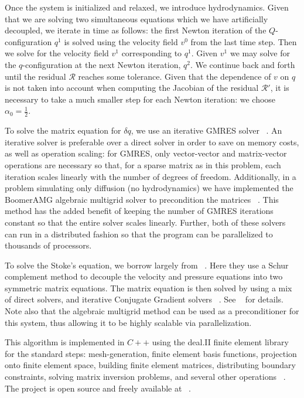 \documentclass[reqno]{article}
\begin{document}
  Once the system is initialized and relaxed, we introduce hydrodynamics.
  Given that we are solving two simultaneous equations which we have
  artificially decoupled, we iterate in time as follows: the first Newton
  iteration of the $Q$-configuration $q^1$ is solved using the velocity field
  $v^0$ from the last time step.
  Then we solve for the velocity field $v^1$ corresponding to $q^1$.
  Given $v^1$ we may solve for the $q$-configuration at the next Newton
  iteration, $q^2$.
  We continue back and forth until the residual $\mathcal{R}$ reaches some
  tolerance.
  Given that the dependence of $v$ on $q$ is not taken into account when
  computing the Jacobian of the residual $\mathcal{R}'$, it is necessary to take
  a much smaller step for each Newton iteration: we choose $\alpha_0 =
  \tfrac12$.

  To solve the matrix equation for $\delta q$, we use an iterative GMRES solver ~\cite{demmel_applied_1997}.
  An iterative solver is preferable over a direct solver in order to save on
  memory costs, as well as operation scaling: for GMRES, only vector-vector and
  matrix-vector operations are necessary so that, for a sparse matrix as in this
  problem, each iteration scales linearly with the number of degrees of freedom.
  Additionally, in a problem simulating only diffusion (no hydrodynamics) we
  have implemented the BoomerAMG algebraic multigrid solver to precondition the
  matrices ~\cite{henson_boomeramg_2002}.
  This method has the added benefit of keeping the number of GMRES iterations
  constant so that the entire solver scales linearly.
  Further, both of these solvers can run in a distributed fashion so that the
  program can be parallelized to thousands of processors.

  To solve the Stoke's equation, we borrow largely from ~\cite{step_22}.
  Here they use a Schur complement method to decouple the velocity and pressure
  equations into two symmetric matrix equations.
  The matrix equation is then solved by using a mix of direct solvers, and
  iterative Conjugate Gradient solvers ~\cite{demmel_applied_1997}.
  See ~\cite{step_22} for details.
  Note also that the algebraic multigrid method can be used as a preconditioner
  for this system, thus allowing it to be highly scalable via parallelization.

  This algorithm is implemented in $C++$ using the deal.II finite element
  library for the standard steps: mesh-generation, finite element basis
  functions, projection onto finite element space, building finite element
  matrices, distributing boundary constraints, solving matrix inversion
  problems, and several other operations ~\cite{dealII93, dealii2019design}.
  The project is open source and freely available at
  ~\cite{Myers_maier-saupe-lc-hydrodynamics_2022}.
\end{document}
